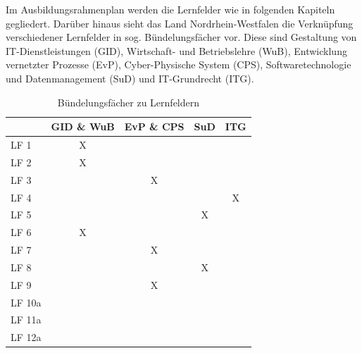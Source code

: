 Im Ausbildungsrahmenplan werden die Lernfelder wie in folgenden Kapiteln gegliedert. Darüber hinaus sieht das Land Nordrhein-Westfalen die Verknüpfung verschiedener Lernfelder in sog. Bündelungsfächer vor. Diese sind Gestaltung von IT-Dienstleistungen (GID), Wirtschaft- und Betriebslehre (WuB), Entwicklung vernetzter Prozesse (EvP), Cyber-Physische System (CPS), Softwaretechnologie und Datenmanagement (SuD) und IT-Grundrecht (ITG).

\begin{table}[H]
    \centering
    \begin{tabulary}{\textwidth}{|L|C|C|C|C|}
         & GID \& WuB    & EvP \& CPS    & SuD   & ITG \\\hline
        LF 1            & X             &               &       &     \\\hline
        LF 2            & X             &               &       &     \\\hline
        LF 3            &               & X             &       &     \\\hline
        LF 4            &               &               &       & X   \\\hline
        LF 5            &               &               & X     &     \\\hline
        LF 6            & X             &               &       &     \\\hline
        LF 7            &               & X             &       &     \\\hline
        LF 8            &               &               & X     &     \\\hline
        LF 9            &               & X             &       &     \\\hline
        LF 10a          &               &               &       &     \\\hline
        LF 11a          &               &               &       &     \\\hline
        LF 12a          &               &               &       &     \\\hline
    \end{tabulary}
    \caption{Bündelungsfächer zu Lernfeldern}
    \label{tab:buendelfaecher}
\end{table}